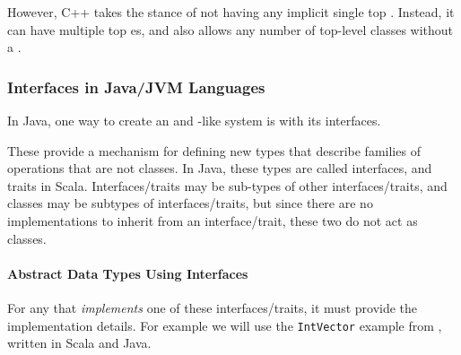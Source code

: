 However, C++ takes the stance of not having any implicit single top .
Instead, it can have multiple top es, and also allows any number of top-level classes without a .

\subsubsection{Interfaces in Java/JVM Languages}\label{subsubsec:Java_Interfaces}
In Java, one way to create an  and -like system is with its interfaces.

These provide a mechanism for defining new types that describe families of operations that are not classes.
In Java, these types are called interfaces, and traits in Scala.
Interfaces/traits may be sub-types of other interfaces/traits, and classes may be subtypes of interfaces/traits, but since there are no implementations to inherit from an interface/trait, these two do not act as classes.

\paragraph{Abstract Data Types Using Interfaces}\label{par:OOP_ADTs_Interfaces}
For any  that \emph{implements} one of these interfaces/traits, it must provide the implementation details.
For example we will use the \texttt{IntVector} example from , written in Scala and Java.
\inputminted[frame=lines,linenos]{scala}{./EDAP05-Concepts_Programming_Languages-Sections/Object_Oriented_Programming/Code/IntVector.scala}
\inputminted[frame=lines,linenos]{scala}{./EDAP05-Concepts_Programming_Languages-Sections/Object_Oriented_Programming/Code/IntVector.java}

